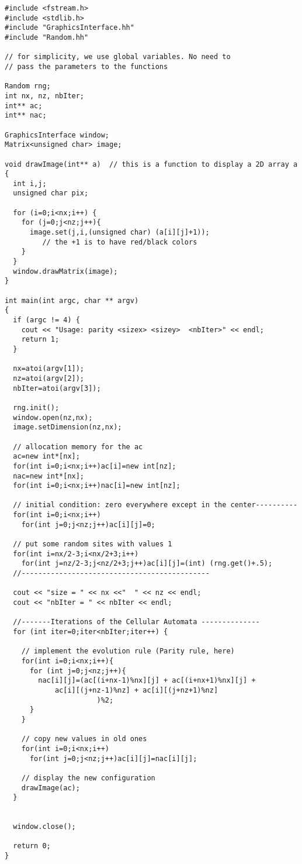 \documentclass[12pt,a4paper]{article}
\begin{document}
\begin{verbatim}
#include <fstream.h> 
#include <stdlib.h>
#include "GraphicsInterface.hh"
#include "Random.hh"

// for simplicity, we use global variables. No need to
// pass the parameters to the functions

Random rng;
int nx, nz, nbIter;
int** ac;
int** nac;

GraphicsInterface window;
Matrix<unsigned char> image;

void drawImage(int** a)  // this is a function to display a 2D array a
{
  int i,j;
  unsigned char pix;   

  for (i=0;i<nx;i++) {
    for (j=0;j<nz;j++){
      image.set(j,i,(unsigned char) (a[i][j]+1)); 
         // the +1 is to have red/black colors
    }    
  }
  window.drawMatrix(image);
}

int main(int argc, char ** argv)
{
  if (argc != 4) {
    cout << "Usage: parity <sizex> <sizey>  <nbIter>" << endl;
    return 1;
  }

  nx=atoi(argv[1]);
  nz=atoi(argv[2]);
  nbIter=atoi(argv[3]);

  rng.init();
  window.open(nz,nx);
  image.setDimension(nz,nx);

  // allocation memory for the ac
  ac=new int*[nx];
  for(int i=0;i<nx;i++)ac[i]=new int[nz];
  nac=new int*[nx];
  for(int i=0;i<nx;i++)nac[i]=new int[nz];

  // initial condition: zero everywhere except in the center----------
  for(int i=0;i<nx;i++)
    for(int j=0;j<nz;j++)ac[i][j]=0;

  // put some random sites with values 1
  for(int i=nx/2-3;i<nx/2+3;i++)
    for(int j=nz/2-3;j<nz/2+3;j++)ac[i][j]=(int) (rng.get()+.5);
  //---------------------------------------------

  cout << "size = " << nx <<"  " << nz << endl;
  cout << "nbIter = " << nbIter << endl;

  //-------Iterations of the Cellular Automata --------------
  for (int iter=0;iter<nbIter;iter++) {

    // implement the evolution rule (Parity rule, here)
    for(int i=0;i<nx;i++){
      for (int j=0;j<nz;j++){
		nac[i][j]=(ac[(i+nx-1)%nx][j] + ac[(i+nx+1)%nx][j] +
	        ac[i][(j+nz-1)%nz] + ac[i][(j+nz+1)%nz]
	                  )%2;
      }
    }

    // copy new values in old ones
    for(int i=0;i<nx;i++)
      for(int j=0;j<nz;j++)ac[i][j]=nac[i][j];

    // display the new configuration
    drawImage(ac);
  }


  window.close();

  return 0;
}
\end{verbatim}
\end{document}

